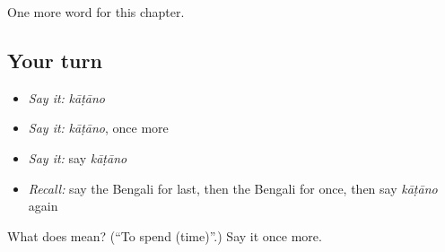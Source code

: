 \begin{grammarlens}[title={What you've built}]
One more word for this chapter.
\end{grammarlens}

\subsection*{Your turn}
\begin{itemize}
\raggedright
  \item \emph{Say it:} \emph{kāṭāno}
  \item \emph{Say it:} \emph{kāṭāno}, once more
  \item \emph{Say it:} say \emph{kāṭāno}
  \item \emph{Recall:} say the Bengali for last, then the Bengali for once, then say \emph{kāṭāno} again
\end{itemize}

\begin{tcolorbox}[breakable,colback=teal!4,colframe=teal!35!black,title={Before you move on}]
What does  mean? (\textquotedblleft{}To spend (time)\textquotedblright{}.) Say it once more.
\end{tcolorbox}
